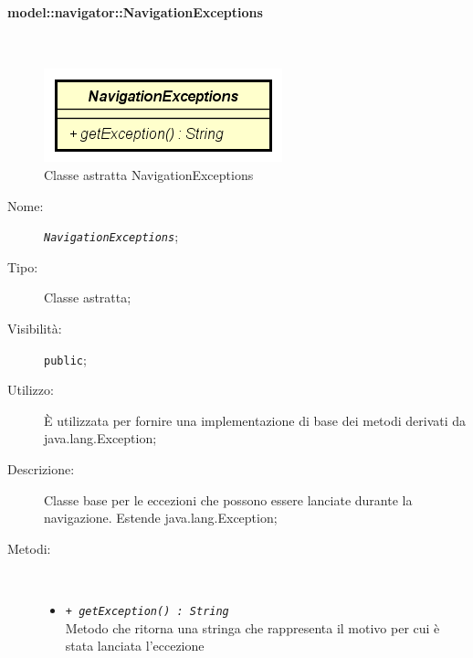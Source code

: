 \documentclass[../DefinizioneDiProdotto.tex]{subfiles}
\begin{document}
\paragraph{model::navigator::NavigationExceptions}
\
\begin{figure}[H]
	\centering
	\includegraphics[width=\maxwidth]{img/NavigationExceptions.png}
	\caption{Classe astratta NavigationExceptions}\label{fig:model::navigator::NavigationExceptions} 
\end{figure}
\begin{description}
	\item[Nome:] \texttt{\textit{NavigationExceptions}};
	\item[Tipo:] Classe astratta;
	\item[Visibilità:] \texttt{public};
	\item[Utilizzo:] È utilizzata per fornire una implementazione di base dei metodi derivati da java.lang.Exception;
	\item[Descrizione:] Classe base per le eccezioni che possono essere lanciate durante la navigazione. Estende java.lang.Exception;
	\item[Metodi:] \
	\begin{itemize}
		\item \texttt{+ \textit{getException() : String}}\\
		Metodo che ritorna una stringa che rappresenta il motivo per cui è stata lanciata l'eccezione
	\end{itemize}
\end{description}
\end{document}
